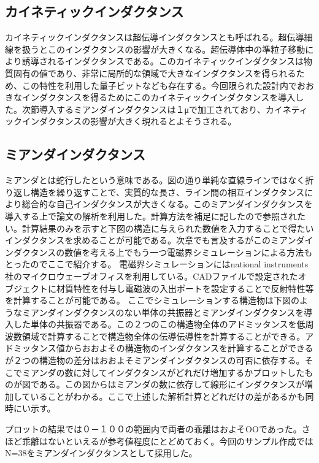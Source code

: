    \subsection{カイネティックインダクタンス}
        カイネティックインダクタンスは超伝導インダクタンスとも呼ばれる。超伝導細線を扱うとこのインダクタンスの影響が大きくなる。超伝導体中の準粒子移動により誘導されるインダクタンスである。このカイネティックインダクタンスは物質固有の値であり、非常に局所的な領域で大きなインダクタンスを得られるため、この特性を利用した量子ビットなども存在する。今回限られた設計内でおおきなインダクタンスを得るためにこのカイネティックインダクタンスを導入した。次節導入するミアンダインダクタンスは１μで加工されており、カイネティックインダクタンスの影響が大きく現れるとよそうされる。
    \subsection{ミアンダインダクタンス}
        ミアンダとは蛇行したという意味である。図の通り単純な直線ラインではなく折り返し構造を繰り返すことで、実質的な長さ、ライン間の相互インダクタンスにより総合的な自己インダクタンスが大きくなる。このミアンダインダクタンスを導入する上で論文の解析を利用した。計算方法を補足に記したので参照されたい。計算結果のみを示すと下図の構造に与えられた数値を入力することで得たいインダクタンスを求めることが可能である。次章でも言及するがこのミアンダインダクタンスの数値を考える上でもう一つ電磁界シミュレーションによる方法もとったのでここで紹介する。
        電磁界シミュレーションにはnational instruments社のマイクロウェーブオフィスを利用している。CADファイルで設定されたオブジェクトに材質特性を付与し電磁波の入出ポートを設定することで反射特性等を計算することが可能である。
        ここでシミュレーションする構造物は下図のようなミアンダインダクタンスのない単体の共振器とミアンダインダクタンスを導入した単体の共振器である。この２つのこの構造物全体のアドミッタンスを低周波数領域で計算することで構造物全体の伝導伝導性を計算することができる。アドミッタンス値からおおよその構造物のインダクタンスを計算することができるが２つの構造物の差分はおおよそミアンダインダクタンスの可否に依存する。そこでミアンダの数に対してインダクタンスがどれだけ増加するかプロットしたものが図である。この図からはミアンダの数に依存して線形にインダクタンスが増加していることがわかる。ここで上述した解析計算とどれだけの差があるかも同時にい示す。

        プロットの結果では０－１００の範囲内で両者の乖離はおよそOOであった。さほど乖離はないといえるが参考値程度にとどめておく。今回のサンプル作成ではN=38をミアンダインダクタンスとして採用した。

